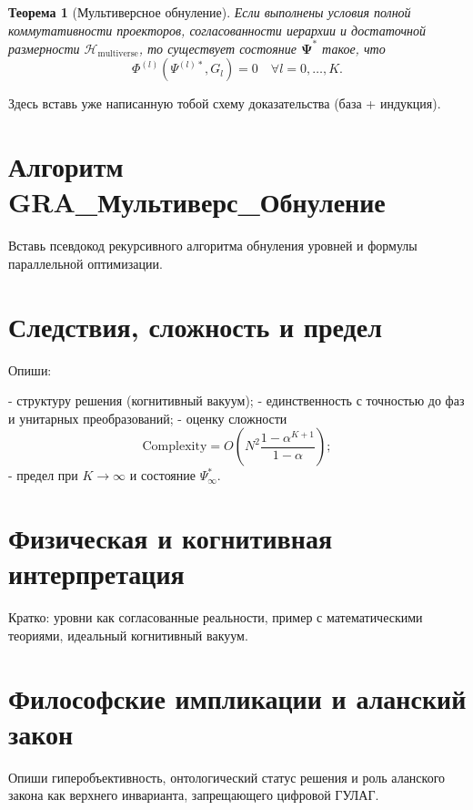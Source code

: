 \documentclass[12pt,a4paper]{article}
\theoremstyle{plain}
\newtheorem{theorem}{Теорема}
\begin{document}
\begin{theorem}[Мультиверсное обнуление]
Если выполнены условия полной коммутативности проекторов,
согласованности иерархии и достаточной размерности
$\mathcal{H}_{\text{multiverse}}$, то существует состояние
$\mathbf{\Psi}^*$ такое, что
\[
\Phi^{(l)}(\Psi^{(l)*},G_l) = 0 \quad \forall l=0,\dots,K.
\]
\end{theorem}

Здесь вставь уже написанную тобой схему доказательства (база + индукция).

\section{Алгоритм GRA\_Мультиверс\_Обнуление}

Вставь псевдокод рекурсивного алгоритма обнуления уровней и формулы параллельной оптимизации.

\section{Следствия, сложность и предел}

Опиши:

- структуру решения (когнитивный вакуум);  
- единственность с точностью до фаз и унитарных преобразований;  
- оценку сложности
\[
\text{Complexity} = O\left( N^2 \frac{1-\alpha^{K+1}}{1-\alpha} \right);
\]
- предел при $K\to\infty$ и состояние $\Psi^*_\infty$.

\section{Физическая и когнитивная интерпретация}

Кратко: уровни как согласованные реальности, пример с математическими теориями, идеальный когнитивный вакуум.

\section{Философские импликации и аланский закон}

Опиши гиперобъективность, онтологический статус решения и роль аланского закона как верхнего инварианта, запрещающего цифровой ГУЛАГ.
\end{document}
